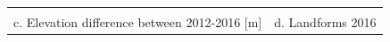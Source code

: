 \documentclass{standalone}
\begin{document}
\begin{tabular}{m{} m{}}
\\
\\
\multicolumn{1}{c}{c. Elevation difference between 2012-2016 [m]} & \multicolumn{1}{c}{d. Landforms 2016}\\
%
\end{tabular}
\end{document}
